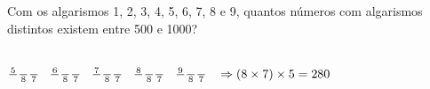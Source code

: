 \begin{ex}
 Com os algarismos 1, 2, 3, 4, 5, 6, 7, 8 e 9, quantos números com algarismos distintos existem entre 500 e 1000?
   \begin{sol}
       \phantom{A} \\
   $\frac{5}{\phantom{A}}\frac{\phantom{A}}{8}\frac{\phantom{A}}{7}\hspace{3mm}\frac{6}{\phantom{A}}\frac{\phantom{A}}{8}\frac{\phantom{A}}{7}\hspace{3mm}\frac{7}{\phantom{A}}\frac{\phantom{A}}{8}\frac{\phantom{A}}{7}\hspace{3mm} \frac{8}{\phantom{A}}\frac{\phantom{A}}{8}\frac{\phantom{A}}{7}\hspace{3mm} \frac{9}{\phantom{A}}\frac{\phantom{A}}{8}\frac{\phantom{A}}{7}\hspace{3mm}\Rightarrow (8\times7)\times5=280$
   \end{sol}
 
\end{ex}